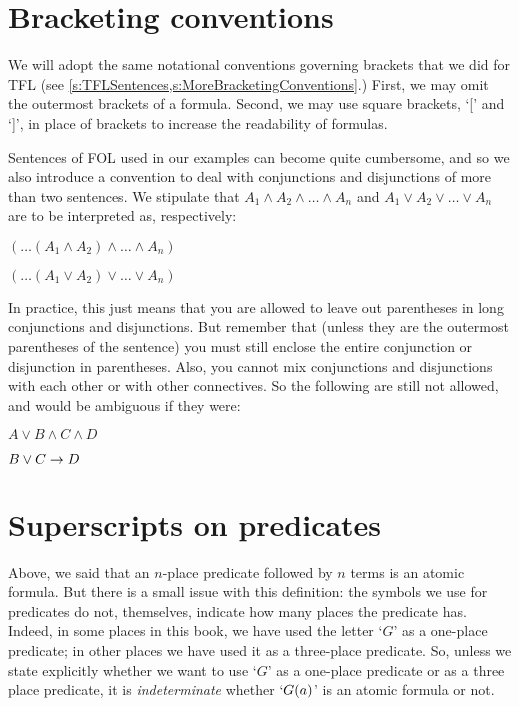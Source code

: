 \section{Bracketing conventions}

We will adopt the same notational conventions governing brackets that we did for TFL (see \cref{s:TFLSentences,s:MoreBracketingConventions}.) First, we may omit the outermost brackets of a formula.  Second, we may use square brackets, `[' and `]', in place of brackets to increase the readability of formulas.

Sentences of FOL used in our examples can become quite cumbersome, and so we also introduce a convention to deal with conjunctions and disjunctions of more than two sentences. We stipulate that $A_1 \land A_2 \land \dots \land A_n$ and $A_1 \lor A_2 \lor \dots \lor A_n$ are to be interpreted as, respectively:
\begin{earg}
	\item[] $(\dots(A_1 \land A_2) \land \dots \land A_n)$
	\item[] $(\dots(A_1 \lor A_2) \lor \dots \lor A_n)$
\end{earg}
In practice, this just means that you are allowed to leave out parentheses in long conjunctions and disjunctions. But remember that (unless they are the outermost parentheses of the sentence) you must still enclose the entire conjunction or disjunction in parentheses. Also, you cannot mix conjunctions and disjunctions with each other or with other connectives. So the following are still not allowed, and would be ambiguous if they were:
\begin{earg}
	\item[] $A \lor B \land C \land D$
	\item[] $B \lor C \rightarrow D$
\end{earg}

\section{Superscripts on predicates}
Above, we said that an $n$-place predicate followed by $n$ terms is an atomic formula. But there is a small issue with this definition: the symbols we use for predicates do not, themselves, indicate how many places the predicate has. Indeed, in some places in this book, we have used the letter `$G$' as a one-place predicate; in other places we have used it as a three-place predicate. So, unless we state explicitly whether we want to use `$G$' as a one-place predicate or as a three place predicate, it is \emph{indeterminate} whether `$G(a)$' is an atomic formula or not.

